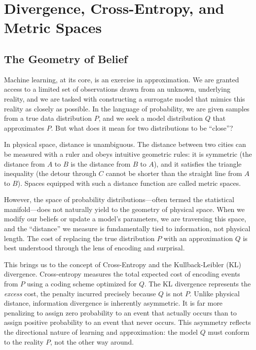 \chapter{Divergence, Cross-Entropy, and Metric Spaces}

\section{The Geometry of Belief}
Machine learning, at its core, is an exercise in approximation. We are granted access to a limited set of observations drawn from an unknown, underlying reality, and we are tasked with constructing a surrogate model that mimics this reality as closely as possible. In the language of probability, we are given samples from a true data distribution $P$, and we seek a model distribution $Q$ that approximates $P$. But what does it mean for two distributions to be ``close''?

In physical space, distance is unambiguous. The distance between two cities can be measured with a ruler and obeys intuitive geometric rules: it is symmetric (the distance from $A$ to $B$ is the distance from $B$ to $A$), and it satisfies the triangle inequality (the detour through $C$ cannot be shorter than the straight line from $A$ to $B$). Spaces equipped with such a distance function are called metric spaces.

However, the space of probability distributions---often termed the statistical manifold---does not naturally yield to the geometry of physical space. When we modify our beliefs or update a model's parameters, we are traversing this space, and the ``distance'' we measure is fundamentally tied to information, not physical length. The cost of replacing the true distribution $P$ with an approximation $Q$ is best understood through the lens of encoding and surprisal.

This brings us to the concept of Cross-Entropy and the Kullback-Leibler (KL) divergence. Cross-entropy measures the total expected cost of encoding events from $P$ using a coding scheme optimized for $Q$. The KL divergence represents the \textit{excess} cost, the penalty incurred precisely because $Q$ is not $P$. Unlike physical distance, information divergence is inherently asymmetric. It is far more penalizing to assign zero probability to an event that actually occurs than to assign positive probability to an event that never occurs. This asymmetry reflects the directional nature of learning and approximation: the model $Q$ must conform to the reality $P$, not the other way around.

